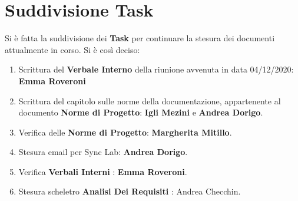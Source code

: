 	\section{Suddivisione Task}
	Si è fatta la suddivisione dei \textbf{Task} per continuare la stesura dei documenti attualmente in corso.
	Si è così deciso:
	\begin{enumerate}
		\item Scrittura del \textbf{Verbale Interno} della riunione avvenuta in data 04/12/2020: \textbf{Emma Roveroni}
		\item Scrittura del capitolo sulle norme della documentazione, appartenente al documento \textbf{Norme di Progetto}: \textbf{Igli Mezini} e \textbf{Andrea Dorigo}.
		\item Verifica delle \textbf{Norme di Progetto}: \textbf{Margherita Mitillo}.
		\item Stesura email per Sync Lab: \textbf{Andrea Dorigo}.
		\item Verifica \textbf{Verbali Interni} : \textbf{Emma Roveroni}.
		\item Stesura scheletro \textbf{Analisi Dei Requisiti} : Andrea Checchin.
	\end{enumerate}
